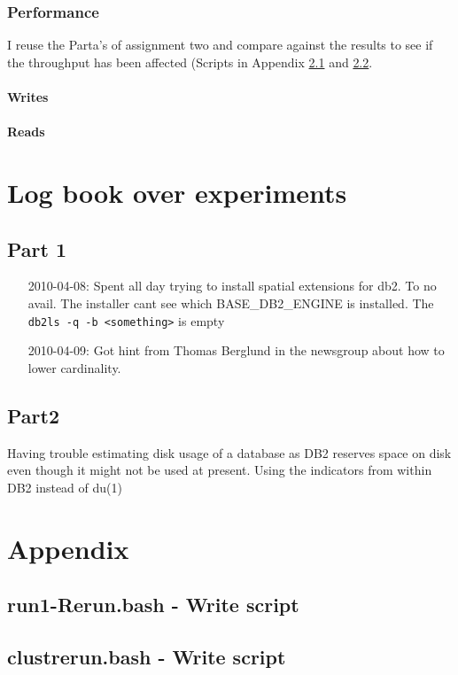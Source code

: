 \subsection{Performance}
I reuse the Parta's of assignment two and compare against the results to see if
the throughput has been affected (Scripts in Appendix \ref{app:run1rr} and
\ref{app:clustrr}.

\subsubsection{Writes}


\subsubsection{Reads}



\chapter{Log book over experiments}\label{log}
\section{Part 1}

\begin{itemize}
\item[2010-04-08:] Spent all day trying to install spatial extensions for db2.
To no avail. The installer cant see which BASE_DB2_ENGINE is installed. The
\verb|db2ls -q -b <something>| is empty
\item[2010-04-09:] Got hint from Thomas Berglund in the newsgroup about how to
  lower cardinality.
\end{itemize}

\section{Part2}
\item[2010-04-09:] Having trouble estimating disk usage of a database as DB2
  reserves space on disk even though it might not be used at present. Using the
  indicators from within DB2 instead of du(1)
\appendix
\newpage
\chapter{Appendix}

\section{run1-Rerun.bash - Write script}\label{app:run1rr}


\section{clustrerun.bash - Write script}\label{app:clustrr}



